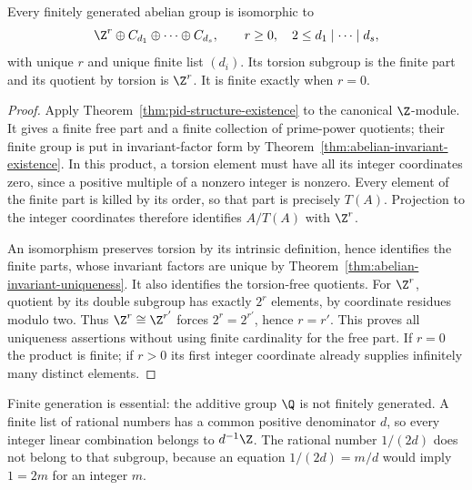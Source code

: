 \begin{theorem}\label{thm:fg-abelian-structure}
Every finitely generated abelian group is isomorphic to
\[
 \Z^r\oplus C_{d_1}\oplus\cdots\oplus C_{d_s},\qquad
 r\geq0,\quad 2\leq d_1\mid\cdots\mid d_s,
\]
with unique $r$ and unique finite list $(d_i)$. Its torsion subgroup is the finite part and its quotient by torsion is $\Z^r$. It is finite exactly when $r=0$.
\end{theorem}
\begin{proof}
Apply Theorem~\ref{thm:pid-structure-existence} to the canonical $\Z$-module. It gives a finite free part and a finite collection of prime-power quotients; their finite group is put in invariant-factor form by Theorem~\ref{thm:abelian-invariant-existence}. In this product, a torsion element must have all its integer coordinates zero, since a positive multiple of a nonzero integer is nonzero. Every element of the finite part is killed by its order, so that part is precisely $T(A)$. Projection to the integer coordinates therefore identifies $A/T(A)$ with $\Z^r$.

An isomorphism preserves torsion by its intrinsic definition, hence identifies the finite parts, whose invariant factors are unique by Theorem~\ref{thm:abelian-invariant-uniqueness}. It also identifies the torsion-free quotients. For $\Z^r$, quotient by its double subgroup has exactly $2^r$ elements, by coordinate residues modulo two. Thus $\Z^r\cong\Z^{r'}$ forces $2^r=2^{r'}$, hence $r=r'$. This proves all uniqueness assertions without using finite cardinality for the free part. If $r=0$ the product is finite; if $r>0$ its first integer coordinate already supplies infinitely many distinct elements.
\end{proof}

Finite generation is essential: the additive group $\Q$ is not finitely generated. A finite list of rational numbers has a common positive denominator $d$, so every integer linear combination belongs to $d^{-1}\Z$. The rational number $1/(2d)$ does not belong to that subgroup, because an equation $1/(2d)=m/d$ would imply $1=2m$ for an integer $m$.

